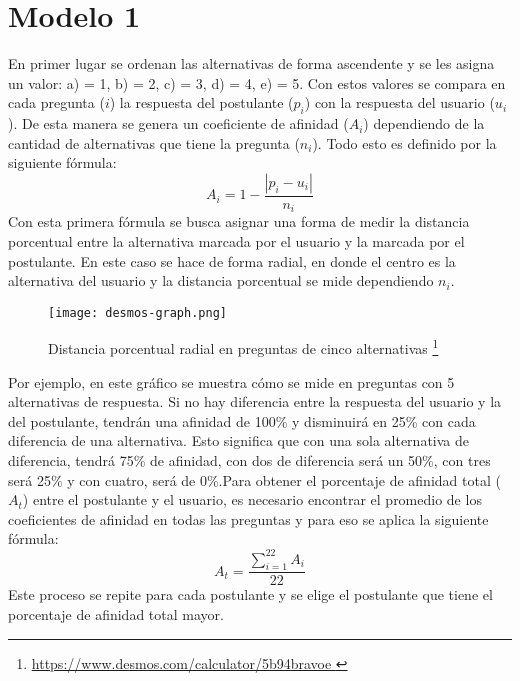 \documentclass[a4paper]{article}
\begin{document}
\section{Modelo 1}
En primer lugar se ordenan las alternativas de forma ascendente y se les asigna un valor: a) = 1, b) = 2, c) = 3, d) = 4, e) = 5. Con estos valores se compara en cada pregunta ($i$) la respuesta del postulante ($p_{i}$) con la respuesta del usuario ($u_{i}$). De esta manera se genera un coeficiente de afinidad ($A_{i}$) dependiendo de la cantidad de alternativas que tiene la pregunta ($n_{i}$). Todo esto es definido por la siguiente fórmula: 
\begin{equation*}
    A_{i}= 1-\frac{|p_{i}-u_{i}|}{n_{i}}
\end{equation*}
Con esta primera fórmula se busca asignar una forma de medir la distancia porcentual entre la alternativa marcada por el usuario y la marcada por el postulante. En este caso se hace de forma radial, en donde el centro es la alternativa del usuario y la distancia porcentual se mide dependiendo $n_{i}$.  \newline
\begin{figure}[H]
    \begin{center}
    \texttt{[image: desmos-graph.png]}
    \end{center}    
    \caption{ Distancia porcentual radial en preguntas de cinco alternativas \footnote{\url{ https://www.desmos.com/calculator/5b94bravoe }}}
\end{figure} 
Por ejemplo, en este gráfico se muestra cómo se mide en preguntas con 5 alternativas de respuesta. Si no hay diferencia entre la respuesta del usuario y la del postulante, tendrán una afinidad de 100\% y disminuirá en 25\% con cada diferencia de una alternativa. Esto significa que con una sola alternativa de diferencia, tendrá 75\% de afinidad, con dos de diferencia será un 50\%, con tres será 25\% y con cuatro, será de 0\%.\newline\newline Para obtener el porcentaje de afinidad total ($A_{t}$) entre el postulante y el usuario, es necesario encontrar el promedio de los coeficientes de afinidad en todas las preguntas y para eso se aplica la siguiente fórmula:
\begin{equation*}
    A_{t}= \dfrac{\sum_{i=1}^{22}A_{i}}{22}
\end{equation*}
Este proceso se repite para cada postulante y se elige el postulante que tiene el porcentaje de afinidad total mayor. 
\end{document}
